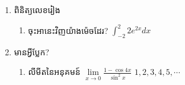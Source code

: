 \documentclass[12pt,a4paper]{article}
\begin{document}
	\begin{enumerate}[I]
		\item ពិនិត្យលេខរៀង
		\begin{enumerate}[m]
			\item ចុះអានេះវិញយ៉ាងម៉េចដែរ? $\int_{-2}^{2}2e^{2x}dx$
		\end{enumerate}
		\item មានអ្វីប្លែក?
		\begin{enumerate}[k]
			\item លីមីតនៃអនុគមន៍ $\lim\limits_{x\to0}\frac{1-\cos4x}{\sin^2x}$
			$1, 2, 3, 4, 5, \cdots$
		\end{enumerate}
	\end{enumerate}
\end{document}
